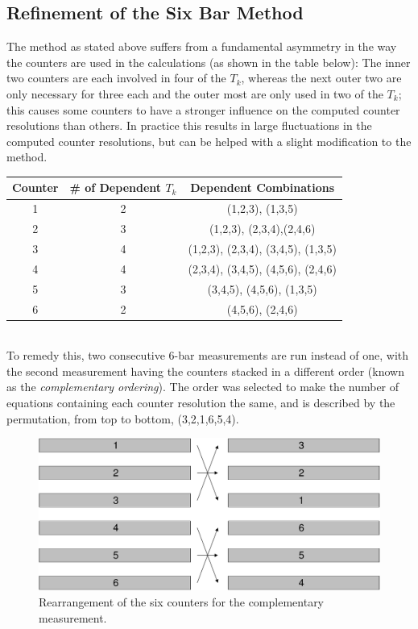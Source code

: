 \subsection{Refinement of the Six Bar Method}
The method as stated above suffers from a fundamental asymmetry in the
way the counters are used in the calculations (as shown in the table
below): The inner two counters are each involved in four of the $T_k$,
whereas the next outer two are only necessary for three each and the
outer most are only used in two of the $T_k$; this causes some
counters to have a stronger influence on the computed counter
resolutions than others.  In practice this results in large
fluctuations in the computed counter resolutions, but can be helped
with a slight modification to the method.\\

\begin{tabular}[c]{c || c || c}
  Counter & \# of Dependent $T_k$ & Dependent Combinations\\ \hline
  1 & 2 & (1,2,3), (1,3,5)\\
  2 & 3 & (1,2,3), (2,3,4),(2,4,6)\\
  3 & 4 & (1,2,3), (2,3,4), (3,4,5), (1,3,5)\\
  4 & 4 & (2,3,4), (3,4,5), (4,5,6), (2,4,6)\\
  5 & 3 & (3,4,5), (4,5,6), (1,3,5)\\
  6 & 2 & (4,5,6), (2,4,6)\\
\end{tabular}\\

To remedy this, two consecutive 6-bar measurements are run instead of
one, with the second measurement having the counters stacked in a
different order (known as the \textit{complementary ordering}).  The
order was selected to make the number of equations containing each
counter resolution the same, and is described by the permutation, from
top to bottom, (3,2,1,6,5,4).

\begin{figure}[H]
  \centering
  \includegraphics[width=15cm]{gary/fig_gary_six_bar_refinement/complementary.pdf}
  \caption{Rearrangement of the six counters for the complementary
    measurement.}
  \label{complementary}
\end{figure}

